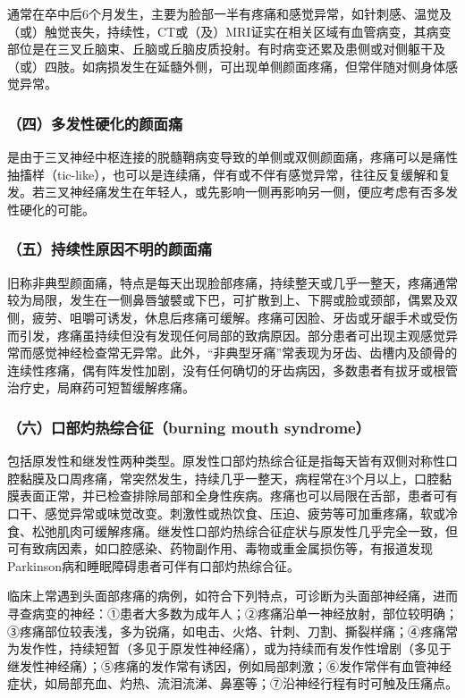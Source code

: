 通常在卒中后6个月发生，主要为脸部一半有疼痛和感觉异常，如针刺感、温觉及（或）触觉丧失，持续性，CT或（及）MRI证实在相关区域有血管病变，其病变部位是在三叉丘脑束、丘脑或丘脑皮质投射。有时病变还累及患侧或对侧躯干及（或）四肢。如病损发生在延髓外侧，可出现单侧颜面疼痛，但常伴随对侧身体感觉异常。

\subsubsection{（四）多发性硬化的颜面痛}

是由于三叉神经中枢连接的脱髓鞘病变导致的单侧或双侧颜面痛，疼痛可以是痛性抽搐样（tic-like），也可以是连续痛，伴有或不伴有感觉异常，往往反复缓解和复发。若三叉神经痛发生在年轻人，或先影响一侧再影响另一侧，便应考虑有否多发性硬化的可能。

\subsubsection{（五）持续性原因不明的颜面痛}

旧称非典型颜面痛，特点是每天出现脸部疼痛，持续整天或几乎一整天，疼痛通常较为局限，发生在一侧鼻唇皱襞或下巴，可扩散到上、下腭或脸或颈部，偶累及双侧，疲劳、咀嚼可诱发，休息后疼痛可缓解。疼痛可因脸、牙齿或牙龈手术或受伤而引发，疼痛虽持续但没有发现任何局部的致病原因。部分患者可出现主观感觉异常而感觉神经检查常无异常。此外，“非典型牙痛”常表现为牙齿、齿槽内及颌骨的连续性疼痛，偶有阵发性加剧，没有任何确切的牙齿病因，多数患者有拔牙或根管治疗史，局麻药可短暂缓解疼痛。

\subsubsection{（六）口部灼热综合征（burning mouth syndrome）}

包括原发性和继发性两种类型。原发性口部灼热综合征是指每天皆有双侧对称性口腔黏膜及口周疼痛，常突然发生，持续几乎一整天，病程常在3个月以上，口腔黏膜表面正常，并已检查排除局部和全身性疾病。疼痛也可以局限在舌部，患者可有口干、感觉异常或味觉改变。刺激性或热饮食、压迫、疲劳等可加重疼痛，软或冷食、松弛肌肉可缓解疼痛。继发性口部灼热综合征症状与原发性几乎完全一致，但可有致病因素，如口腔感染、药物副作用、毒物或重金属损伤等，有报道发现Parkinson病和睡眠障碍患者可伴有口部灼热综合征。

临床上常遇到头面部疼痛的病例，如符合下列特点，可诊断为头面部神经痛，进而寻查病变的神经：①患者大多数为成年人；②疼痛沿单一神经放射，部位较明确；③疼痛部位较表浅，多为锐痛，如电击、火烙、针刺、刀割、撕裂样痛；④疼痛常为发作性，持续短暂（多见于原发性神经痛），或为持续而有发作性增剧（多见于继发性神经痛）；⑤疼痛的发作常有诱因，例如局部刺激；⑥发作常伴有血管神经症状，如局部充血、灼热、流泪流涕、鼻塞等；⑦沿神经行程有时可触及压痛点。

